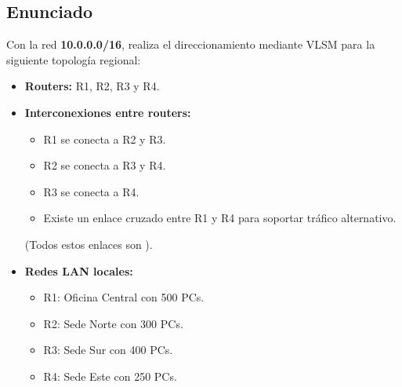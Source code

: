 \documentclass[a4paper,12pt]{article}
\begin{document}
\subsection{Enunciado}
Con la red \textbf{10.0.0.0/16}, realiza el direccionamiento mediante VLSM para la siguiente topología regional:
\begin{itemize}
  \item \textbf{Routers:} R1, R2, R3 y R4.
  \item \textbf{Interconexiones entre routers:}
    \begin{itemize}
      \item R1 se conecta a R2 y R3.
      \item R2 se conecta a R3 y R4.
      \item R3 se conecta a R4.
      \item Existe un enlace cruzado entre R1 y R4 para soportar tráfico alternativo.
    \end{itemize}
    (Todos estos enlaces son \texttt{}).
  \item \textbf{Redes LAN locales:}
    \begin{itemize}
      \item R1: Oficina Central con 500 PCs.
      \item R2: Sede Norte con 300 PCs.
      \item R3: Sede Sur con 400 PCs.
      \item R4: Sede Este con 250 PCs.
    \end{itemize}
\end{itemize}
\end{document}
